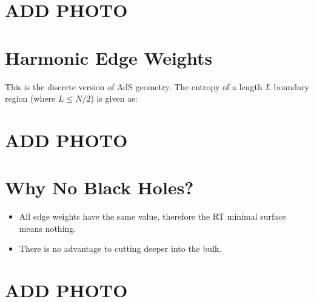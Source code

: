 \documentclass{article}
\begin{document}
\section{ADD PHOTO}

\section{Harmonic Edge Weights}
This is the discrete version of AdS geometry. The entropy of a length \( L \) boundary region (where \( L \leq N/2 \)) is given as:

\section{ADD PHOTO}

\section{Why No Black Holes?}
\begin{itemize}
    \item All edge weights have the same value, therefore the RT minimal surface means nothing.
    \item There is no advantage to cutting deeper into the bulk.
\end{itemize}

\section{ADD PHOTO}
\end{document}
